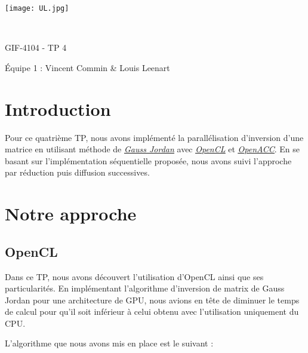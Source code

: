 \documentclass[a4paper, french]{article}
\author{Vincent Commin \& Louis Leenart}
\date{\today}
\begin{document}
\begin{titlepage}
    \begin{flushleft}
        \texttt{[image: UL.jpg]}\par
        \centering

        \vspace{13\baselineskip}
        \HRule \\[0.4cm]

        {\Huge
        GIF-4104 - TP 4\par}
        \vspace{0.4cm}
        \HRule
        \vfill
        Équipe 1 : Vincent Commin \& Louis Leenart\medskip \par
    \end{flushleft}
\end{titlepage}

\newpage
\section{Introduction}

Pour ce quatrième TP, nous avons implémenté la parallélisation d'inversion d'une matrice en utilisant
méthode de \href{https://fr.wikipedia.org/wiki/%C3%89limination_de_Gauss-Jordan}{\textit{\underline{Gauss Jordan}}}
avec  \href{https://www.khronos.org/opencl/}{\textit{\underline{OpenCL}}} et \href{https://www.openacc.org/}{\textit{\underline{OpenACC}}}. En se basant sur l'implémentation séquentielle proposée, nous avons suivi l'approche par réduction puis diffusion successives.

\section{Notre approche}

\subsection{OpenCL}

Dans ce TP, nous avons découvert l'utilisation d'OpenCL ainsi que ses particularités. En implémentant l'algorithme d'inversion de matrix de Gauss Jordan pour une architecture de GPU, nous avions en tête de diminuer le temps de calcul pour qu'il soit inférieur à celui obtenu avec l'utilisation uniquement du CPU.

L'algorithme que nous avons mis en place est le suivant :
\end{document}
